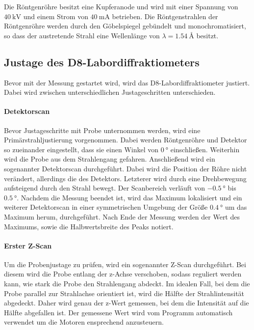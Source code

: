 Die Röntgenröhre besitzt eine Kupferanode und wird mit einer Spannung von $\SI{40}{\kilo\volt}$
und einem Strom von $\SI{40}{\milli\ampere}$ betrieben.
Die Röntgenstrahlen der Röntgenröhre werden durch den Göbelspiegel
gebündelt und monochromatisiert,
so dass der austretende Strahl eine Wellenlänge von
$\lambda=\SI{1.54}{\angstrom}$ besitzt.


\subsection{Justage des D8-Labordiffraktiometers}
\label{subsec:justage}
Bevor mit der Messung gestartet wird, wird das D8-Labordiffraktiometer
justiert. Dabei wird zwischen unterschiedlichen Justageschritten unterschieden.




\paragraph{Detektorscan}
Bevor Justageschritte mit Probe unternommen werden, wird eine Primärstrahljustierung
vorgenommen. Dabei werden Röntgenröhre und Detektor so zueinander eingestellt,
dass sie einen Winkel von $\SI{0}{\degree}$ einschließen. Weiterhin wird die
Probe aus dem Strahlengang gefahren.
Anschließend wird ein sogenannter Detektorscan durchgeführt.
Dabei wird die Position der Röhre nicht verändert, allerdings die des Detektors.
Letzterer wird durch eine Drehbewegung aufsteigend durch den Strahl bewegt. Der Scanbereich
verläuft von $\SI{-0.5}{\degree}$ bis $\SI{0.5}{\degree}$. Nachdem die Messung beendet ist,
wird das Maximum lokalisiert und ein weiterer Detektorscan in einer symmetrischen
Umgebung der Größe $\SI{0.4}{\degree}$ um das Maximum herum, durchgeführt.
Nach Ende der Messung werden der Wert des Maximums, sowie die Halbwertsbreite
des Peaks notiert.

\paragraph{Erster Z-Scan}
Um die Probenjustage zu prüfen,
wird ein sogenannter Z-Scan durchgeführt.
Bei diesem wird die Probe entlang der z-Achse verschoben,
sodass reguliert werden kann, wie stark die Probe den Strahlengang
abdeckt. Im idealen Fall, bei dem die Probe parallel zur Strahlachse
orientiert ist, wird die Hälfte der Strahlintensität abgedeckt.
Daher wird genau der z-Wert gemessen, bei dem die Intensität auf
die Hälfte abgefallen ist. Der gemessene Wert wird vom Programm automatisch
verwendet um die Motoren ensprechend anzusteuern.


